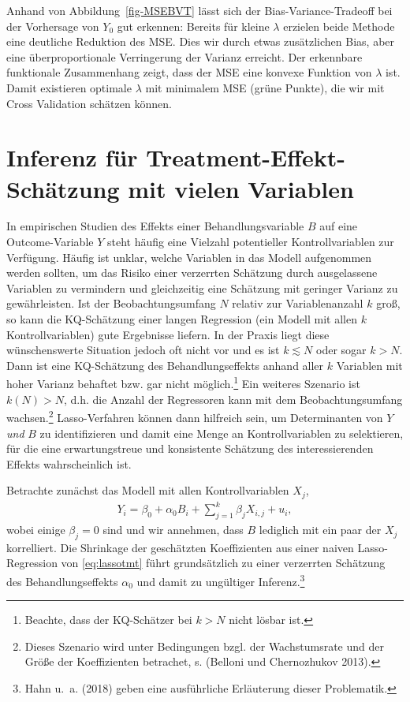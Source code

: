 \documentclass[
  a4paper,
  DIV=11,
  oneside]{scrreprt}
\begin{document}
Anhand von Abbildung~\ref{fig-MSEBVT} lässt sich der
Bias-Variance-Tradeoff bei der Vorhersage von \(Y_0\) gut erkennen:
Bereits für kleine \(\lambda\) erzielen beide Methode eine deutliche
Reduktion des MSE. Dies wir durch etwas zusätzlichen Bias, aber eine
überproportionale Verringerung der Varianz erreicht. Der erkennbare
funktionale Zusammenhang zeigt, dass der MSE eine konvexe Funktion von
\(\lambda\) ist. Damit existieren optimale \(\lambda\) mit minimalem MSE
(grüne Punkte), die wir mit Cross Validation schätzen können.

\hypertarget{inferenz-fuxfcr-treatment-effekt-schuxe4tzung-mit-vielen-variablen}{%
\section{Inferenz für Treatment-Effekt-Schätzung mit vielen
Variablen}\label{inferenz-fuxfcr-treatment-effekt-schuxe4tzung-mit-vielen-variablen}}

In empirischen Studien des Effekts einer Behandlungsvariable \(B\) auf
eine Outcome-Variable \(Y\) steht häufig eine Vielzahl potentieller
Kontrollvariablen zur Verfügung. Häufig ist unklar, welche Variablen in
das Modell aufgenommen werden sollten, um das Risiko einer verzerrten
Schätzung durch ausgelassene Variablen zu vermindern und gleichzeitig
eine Schätzung mit geringer Varianz zu gewährleisten. Ist der
Beobachtungsumfang \(N\) relativ zur Variablenanzahl \(k\) groß, so kann
die KQ-Schätzung einer langen Regression (ein Modell mit allen \(k\)
Kontrollvariablen) gute Ergebnisse liefern. In der Praxis liegt diese
wünschenswerte Situation jedoch oft nicht vor und es ist \(k\lesssim N\)
oder sogar \(k>N\). Dann ist eine KQ-Schätzung des Behandlungseffekts
anhand aller \(k\) Variablen mit hoher Varianz behaftet bzw. gar nicht
möglich.\footnote{Beachte, dass der KQ-Schätzer bei \(k>N\) nicht lösbar
  ist.} Ein weiteres Szenario ist \(k(N)>N\), d.h. die Anzahl der
Regressoren kann mit dem Beobachtungsumfang wachsen.\footnote{Dieses
  Szenario wird unter Bedingungen bzgl. der Wachstumsrate und der Größe
  der Koeffizienten betrachet, s. (Belloni und Chernozhukov 2013).}
Lasso-Verfahren können dann hilfreich sein, um Determinanten von \(Y\)
\emph{und} \(B\) zu identifizieren und damit eine Menge an
Kontrollvariablen zu selektieren, für die eine erwartungstreue und
konsistente Schätzung des interessierenden Effekts wahrscheinlich ist.

Betrachte zunächst das Modell mit allen Kontrollvariablen \(X_j\),
\begin{align}
  Y_i = \beta_0 + \alpha_0 B_i + \sum_{j=1}^k \beta_{j} X_{i,j} + u_i, \label{eq:lassotmt}
\end{align} wobei einige \(\beta_{j}=0\) sind und wir annehmen, dass
\(B\) lediglich mit ein paar der \(X_j\) korrelliert. Die Shrinkage der
geschätzten Koeffizienten aus einer naiven Lasso-Regression von
\eqref{eq:lassotmt} führt grundsätzlich zu einer verzerrten Schätzung
des Behandlungseffekts \(\alpha_0\) und damit zu ungültiger
Inferenz.\footnote{Hahn u.~a. (2018) geben eine ausführliche Erläuterung
  dieser Problematik.}
\end{document}
